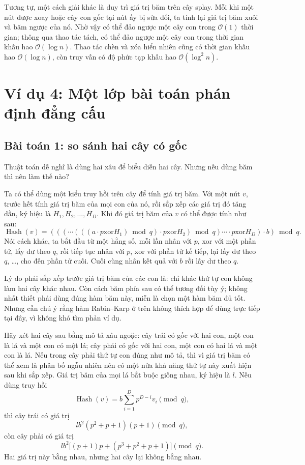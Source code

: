 \documentclass[11pt]{article}
\newcommand{\Oh}{\mathcal{O}}
\newcommand{\Hash}{\operatorname{Hash}}
\newcommand{\xor}{\mathbin{\mathrm{xor}}}
\begin{document}
Tương tự, một cách giải khác là duy trì giá trị băm trên cây splay. Mỗi khi
một nút được xoay hoặc cây con gốc tại nút ấy bị sửa đổi, ta tính lại giá trị
băm xuôi và băm ngược của nó. Nhờ vậy có thể đảo ngược một cây con trong
$\Oh(1)$ thời gian; thông qua thao tác tách, có thể đảo ngược một cây con
trong thời gian khấu hao $\Oh(\log n)$. Thao tác chèn và xóa hiển nhiên cũng
có thời gian khấu hao $\Oh(\log n)$, còn truy vấn có độ phức tạp khấu hao
$\Oh(\log^2 n)$.

\section{Ví dụ 4: Một lớp bài toán phán định đẳng cấu}

\subsection{Bài toán 1: so sánh hai cây có gốc}

Thuật toán dễ nghĩ là dùng hai xâu để biểu diễn hai cây. Nhưng nếu dùng băm
thì nên làm thế nào?

Ta có thể dùng một kiểu truy hồi trên cây để tính giá trị băm. Với một nút
$v$, trước hết tính giá trị băm của mọi con của nó, rồi sắp xếp các giá trị
đó tăng dần, ký hiệu là $H_1,H_2,\ldots,H_D$. Khi đó giá trị băm của $v$ có
thể được tính như sau:
\[
  \Hash(v)=
  (((\cdots(((a\cdot p\xor H_1)\bmod q)\cdot p\xor H_2)\bmod q)\cdots
  \cdot p\xor H_D)\cdot b)\bmod q.
\]
Nói cách khác, ta bắt đầu từ một hằng số, mỗi lần nhân với $p$, xor với một
phần tử, lấy dư theo $q$, rồi tiếp tục nhân với $p$, xor với phần tử kế tiếp,
lại lấy dư theo $q$, \ldots, cho đến phần tử cuối. Cuối cùng nhân kết quả với
$b$ rồi lấy dư theo $q$.

Lý do phải sắp xếp trước giá trị băm của các con là: chỉ khác thứ tự con
không làm hai cây khác nhau. Còn cách băm phía sau có thể tương đối tùy ý;
không nhất thiết phải dùng đúng hàm băm này, miễn là chọn một hàm băm đủ tốt.
Nhưng cần chú ý rằng hàm Rabin--Karp ở trên không thích hợp để dùng trực tiếp
tại đây, vì không khó tìm phản ví dụ.

Hãy xét hai cây sau bằng mô tả xâu ngoặc: cây trái có gốc với hai con, một
con là lá và một con có một lá; cây phải có gốc với hai con, một con có hai
lá và một con là lá. Nếu trong cây phải thứ tự con đúng như mô tả, thì vì
giá trị băm có thể xem là phân bố ngẫu nhiên nên có một nửa khả năng thứ tự
này xuất hiện sau khi sắp xếp. Giá trị băm của mọi lá bắt buộc giống nhau,
ký hiệu là $l$. Nếu dùng truy hồi
\[
  \Hash(v)=b\sum_{i=1}^{D}p^{D-i}v_i\pmod q,
\]
thì cây trái có giá trị
\[
  lb^2(p^2+p+1)(p+1)\pmod q,
\]
còn cây phải có giá trị
\[
  lb^2\bigl[(p+1)p+(p^3+p^2+p+1)\bigr]\pmod q.
\]
Hai giá trị này bằng nhau, nhưng hai cây lại không bằng nhau.
\end{document}
